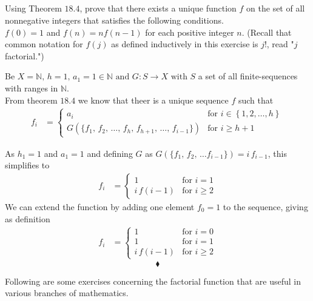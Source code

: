 \subsection{}
\begin{tcolorbox}
Using Theorem $\mathbf{18.4}$, prove that there exists a unique function $f$ on the set of all nonnegative integers that satisfies the following conditions. \\
$f(0) = 1 $ and $ f(n) =nf(n- 1)$ for each positive integer $n$. (Recall that common notation for $f(j)$ as defined inductively in this exercise is $j!$, read "$j$ factorial.")  
\end{tcolorbox}
$$ $$
Be $X=\mathbb{N},\, h=1,\, a_1=1\in \mathbb{N}\text{ and } G: S\rightarrow X\text{ with } S$ a set of all finite-sequences with ranges in $\mathbb{N}$.\\
From theorem $\mathbf{18.4}$ we know that theer is a unique sequence $f$ such that 
\begin{align*}
f_i&= \left\{
\begin{array}{ll}
a_i& \text{for } i\in \left\{1,2,\dots, h\right\}\\
G\left(\{f_1,\,f_2,\,\dots ,\, f_h,\, f_{h+1},\,\dots,\, f_{i-1}\}\right) & \text{for } i\ge h+1
\end{array}
\right.
\end{align*}

As $h_1=1$ and $ a_1=1$ and defining $G$ as $G\left(\{f_1,\,f_2,\,\dots f_{i-1}\}\right)=i\,f_{i-1} $, this simplifies to 
\begin{align*}
f_i&= \left\{
\begin{array}{ll}
1& \text{for } i=1\\
i\, f(i-1) & \text{for } i\ge 2
\end{array}
\right.
\end{align*}
We can extend the function by adding one element $f_0=1$ to the sequence, giving as definition 
\begin{align*}
f_i&= \left\{
\begin{array}{ll}
1& \text{for } i=0\\
1& \text{for } i=1\\
i\, f(i-1) & \text{for } i\ge 2
\end{array}
\right.
\end{align*}
$$\blacklozenge$$

Following are some exercises concerning the factorial function that are useful in various branches of mathematics.\\

